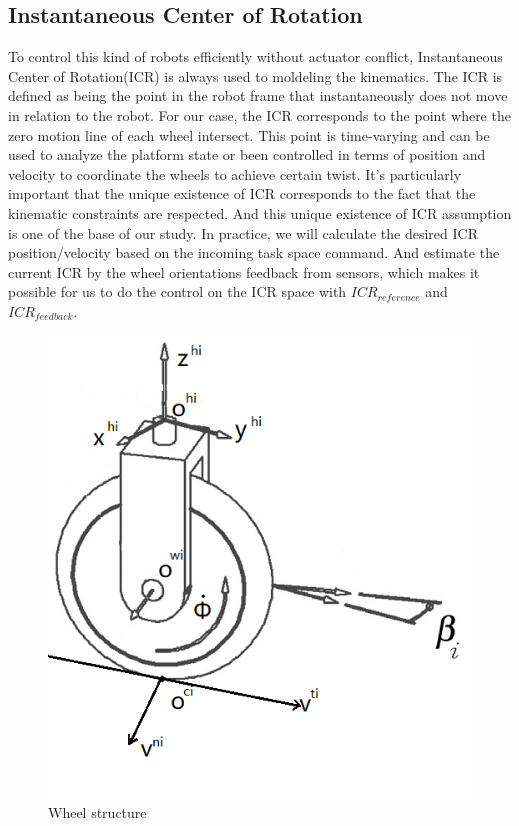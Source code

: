 \subsection{Instantaneous Center of Rotation}
\label{sec:Instantaneous Center of Rotation}
To control this kind of robots efficiently without actuator conflict, Instantaneous Center of Rotation(ICR) is always used to moldeling the kinematics. The ICR is defined as being the point in the robot frame that instantaneously does not move in relation to the robot. For our case, the ICR corresponds to the point where the zero motion line of each wheel intersect. This point is time-varying and can be used to analyze the platform state or been controlled in terms of position and velocity to coordinate the wheels to achieve certain twist. 
It's particularly important that the unique existence of ICR corresponds to the fact that the kinematic constraints are respected. And this unique existence of ICR assumption is one of the base of our study.
In practice, we will calculate the desired ICR position/velocity based on the incoming task space command. And estimate the current ICR by the wheel orientations feedback from sensors, which makes it possible for us to do the control on the ICR space with $ICR_{reference}$ and $ICR_{feedback}$. 



\begin{figure}[t]
\begin{center}
\includegraphics[width=.5\textwidth]{../Figures/wheel.png}
\caption{Wheel structure}
\label{fig:wheel}
\end{center}
\end{figure}

